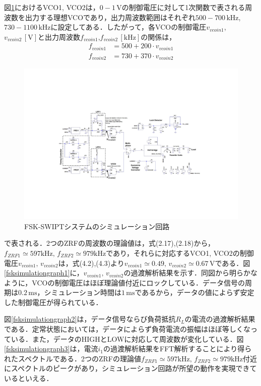 図\ref{fsksimulationcircuit}におけるVCO1, VCO2は，$0-1 \, \mathrm{V}$の制御電圧に対して1次関数で表される周波数を出力する理想VCOであり，出力周波数範囲はそれぞれ$500-700 \, \mathrm{kHz}$, $730-1100 \, \mathrm{kHz}$に設定してある．したがって，各VCOの制御電圧$v_{vcoin1}$,$v_{vcoin2} \, \mathrm{[V]}$と出力周波数$f_{vcoin1}$,$f_{vcoin2} \, \mathrm{[kHz]}$の関係は，
\begin{align}
f_{vcoin1} &=500+200\cdot v_{vcoin1}　\\
f_{vcoin2} &=730+370\cdot v_{vcoin2}
\end{align}
\begin{figure}[H]
\begin{center}

\includegraphics[width=155mm]{figures/fsksimulationcircuit.pdf}
\caption{FSK-SWIPTシステムのシミュレーション回路}
\label{fsksimulationcircuit}
\end{center}

\end{figure}
で表される．2つのZRFの周波数の理論値は，式(2.17),(2.18)から，$f_{ZRF1} \simeq 597\mathrm{kHz}, \, f_{ZRF2} \simeq 979 \mathrm{kHz}$であり，それらに対応するVCO1, VCO2の制御電圧$v_{vcoin1}, \, v_{vcoin2}$は，式(4.2),(4.3)より$v_{vcoin1}\simeq 0.49, \, v_{vcoin2} \simeq 0.67 \, \mathrm{V}$である．図\ref{fsksimulationgraph1}に，$v_{vcoin1}, \, v_{vcoin2}$の過渡解析結果を示す．同図から明らかなように，VCOの制御電圧はほぼ理論値付近にロックしている．データ信号の周期は$0.2 \, \mathrm{ms}$，シミュレーション時間は$1 \, \mathrm{ms}$であるから，データの値によらず安定した制御電圧が得られている．\par
図\ref{fsksimulationgraph2}は，データ信号ならび負荷抵抗$R_L$の電流の過渡解析結果である．定常状態においては，データによらず負荷電流の振幅はほぼ等しくなっている．また，データのHIGHとLOWに対応して周波数が変化している．図\ref{fsksimulationgraph3}は，電流$i_1$の過渡解析結果をFFT解析することにより得られたスペクトルである．2つのZRFの理論値$f_{ZRF1} \simeq 597\mathrm{kHz}, \, f_{ZRF2} \simeq 979 \mathrm{kHz}$付近にスペクトルのピークがあり，シミュレーション回路が所望の動作を実現できているといえる．
